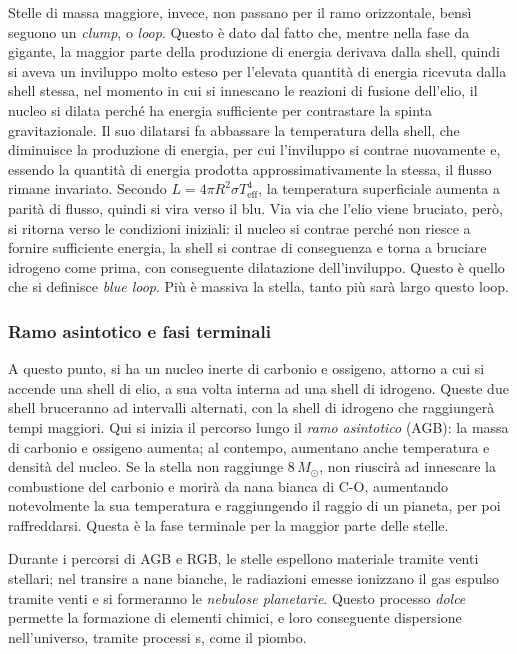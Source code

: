 \documentclass[11pt, a4paper]{scrartcl}
\theoremstyle{style}
\theoremstyle{style1}
\numberwithin{equation}{subsection}
\begin{document}
Stelle di massa maggiore, invece, non passano per il ramo orizzontale, bens\`i seguono un \textit{clump}, o \textit{loop}.
Questo \`e dato dal fatto che, mentre nella fase da gigante, la maggior parte della produzione di energia derivava dalla shell, quindi si aveva un inviluppo molto esteso per l'elevata quantit\`a di energia ricevuta dalla shell stessa, nel momento in cui si innescano le reazioni di fusione dell'elio, il nucleo si dilata perch\'e ha energia sufficiente per contrastare la spinta gravitazionale.
Il suo dilatarsi fa abbassare la temperatura della shell, che diminuisce la produzione di energia, per cui l'inviluppo si contrae nuovamente e, essendo la quantit\`a di energia prodotta approssimativamente la stessa, il flusso rimane invariato. 
Secondo $L= 4\pi R^2 \sigma T_\text{eff}^4$, la temperatura superficiale aumenta a parit\`a di flusso, quindi si vira verso il blu.
Via via che l'elio viene bruciato, per\`o, si ritorna verso le condizioni iniziali: il nucleo si contrae perch\'e non riesce a fornire sufficiente energia, la shell si contrae di conseguenza e torna a bruciare idrogeno come prima, con conseguente dilatazione dell'inviluppo.
Questo \`e quello che si definisce \textit{blue loop}.
Pi\`u \`e massiva la stella, tanto pi\`u sar\`a largo questo loop.

\subsubsection{Ramo asintotico e fasi terminali}
A questo punto, si ha un nucleo inerte di carbonio e ossigeno, attorno a cui si accende una shell di elio, a sua volta interna ad una shell di idrogeno.
Queste due shell bruceranno ad intervalli alternati, con la shell di idrogeno che raggiunger\`a tempi maggiori.
Qui si inizia il percorso lungo il \textit{ramo asintotico} (AGB): la massa di carbonio e ossigeno aumenta; al contempo, aumentano anche temperatura e densit\`a del nucleo.
Se la stella non raggiunge $8\, M_\odot $, non riuscir\`a ad innescare la combustione del carbonio e morir\`a da nana bianca di C-O, aumentando notevolmente la sua temperatura e raggiungendo il raggio di un pianeta, per poi raffreddarsi.
Questa \`e la fase terminale per la maggior parte delle stelle.

Durante i percorsi di AGB e RGB, le stelle espellono materiale tramite venti stellari; nel transire a nane bianche, le radiazioni emesse ionizzano il gas espulso tramite venti e si formeranno le \textit{nebulose planetarie}.
Questo processo \textit{dolce} permette la formazione di elementi chimici, e loro conseguente dispersione nell'universo, tramite processi s, come il piombo.
\end{document}
